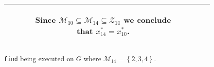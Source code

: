 \begin{figure*}[ht!]
\begin{tabular}[t]{|c|l|}
\begin{subfigure}[b]{0.64\textwidth}
        Since $\mathcal{M}_{10} \subseteq \mathcal{M}_{14} \subseteq
        \mathcal{Z}_{10}$ we conclude that $x_{14}^* = x_{10}^*$.
    \end{subfigure}
    \\ \hline
    \end{tabular}
    \caption{\texttt{find} being executed on $G$ where
             $\mathcal{M}_{14} = \left\{{2,3,4}\right\}$.}
    \label{fig:find}
\end{figure*}
